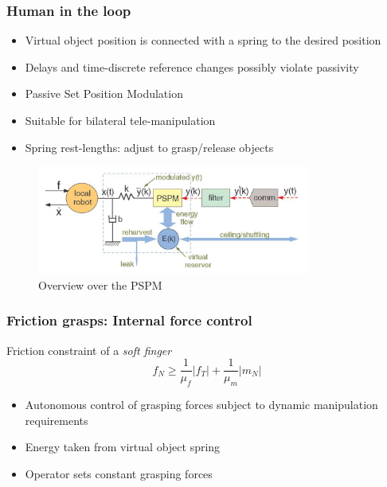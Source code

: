 \documentclass[student]{ITRslides}
\begin{document}
%			
%	
%
%		
%		
%			

\begin{frame}
	\frametitle{Human in the loop}
	\begin{itemize}
			\item Virtual object position is connected with a spring to the desired position
			\item Delays and time-discrete reference changes possibly violate passivity
			\item Passive Set Position Modulation \cite{Lee_10}
			\item Suitable for bilateral tele-manipulation
			\item Spring rest-lengths: adjust to grasp/release objects
		\end{itemize}
		\begin{figure}
					\centering
					\includegraphics[width=0.8\textwidth]{PSPM.png}
					\caption{Overview over the PSPM\cite{Lee_10}}
		\end{figure}
\end{frame}


\begin{frame}
	\frametitle{Friction grasps: Internal force control}
	Friction constraint of a \emph{soft finger}
	\[f_N \geq \frac{1}{\mu_f} \vert f_T \vert + \frac{1}{\mu_m} \vert m_N \vert
	\]
	\begin{itemize}
		\item Autonomous control of grasping forces subject to dynamic manipulation requirements
		\item Energy taken from virtual object spring
		\item Operator sets constant grasping forces
	\end{itemize}
	
	
\end{frame}
\end{document}
